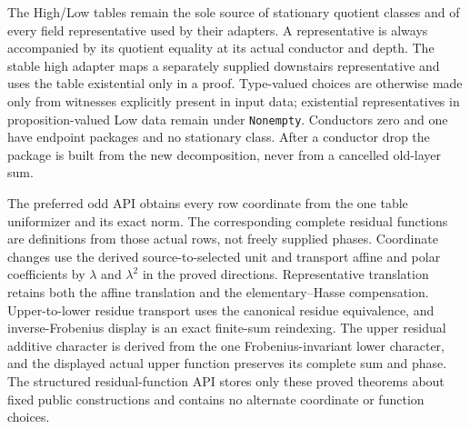 \begin{definition}
\leanok
{}
\FormalizationContract
The High/Low tables remain the sole source of stationary quotient classes
and of every field representative used by their adapters.  A representative
is always accompanied by its quotient equality at its actual conductor and
depth.  The stable high adapter maps a separately supplied downstairs
representative and uses the table existential only in a proof.  Type-valued
choices are otherwise made only from witnesses explicitly present in input
data; existential representatives in proposition-valued Low data remain
under \texttt{Nonempty}.  Conductors zero and one have endpoint packages and
no stationary class.  After a conductor drop the package is built from the
new decomposition, never from a cancelled old-layer sum.

The preferred odd API obtains every row coordinate from the one table
uniformizer and its exact norm.  The corresponding complete residual
functions are definitions from those actual rows, not freely supplied
phases.  Coordinate changes use the derived source-to-selected unit and
transport affine and polar coefficients by $\lambda$ and $\lambda^2$ in the
proved directions.  Representative translation retains both the affine
translation and the elementary--Hasse compensation.  Upper-to-lower residue
transport uses the canonical residue equivalence, and inverse-Frobenius
display is an exact finite-sum reindexing.  The upper residual additive
character is derived from the one Frobenius-invariant lower character, and
the displayed actual upper function preserves its complete sum and phase.
The structured residual-function API stores only these proved
theorems about fixed public constructions and contains no alternate
coordinate or function choices.


\end{definition}
